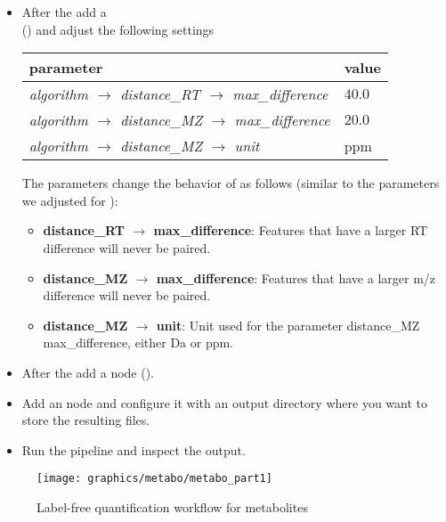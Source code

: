 \begin{itemize}
\item
After the  add a  \\
 () and adjust the following settings

\begin{center}
\begin{tabular}{l|l}
\textbf{parameter} & \textbf{value} \\ \hline
\textit{algorithm $\rightarrow$ distance\_RT $\rightarrow$ max\_difference} & $40.0$ \\
\textit{algorithm $\rightarrow$ distance\_MZ $\rightarrow$ max\_difference} & $20.0$ \\
\textit{algorithm $\rightarrow$ distance\_MZ $\rightarrow$ unit} & ppm
\end{tabular}
\end{center}

\noindent The parameters change the behavior of  as follows (similar to the parameters we adjusted for ):
\begin{itemize}
\item \textbf{distance\_RT $\rightarrow$ max\_difference}: Features that have a larger RT difference will never be paired.
\item \textbf{distance\_MZ $\rightarrow$ max\_difference}: Features that have a larger m/z difference will never be paired.
\item \textbf{distance\_MZ $\rightarrow$ unit}: Unit used for the parameter distance\_MZ max\_difference, either Da or ppm.
\end{itemize}

\item
After the  add a  node ().
\item
Add an  node and configure it with an output directory where you want to store the resulting files.
\item
Run the pipeline and inspect the output.
\end{itemize}

\begin{figure}[htbp]
  \centering
  \texttt{[image: graphics/metabo/metabo\_part1]}
  \caption{Label-free quantification workflow for metabolites}
  \label{fig:metabo_part1}
\end{figure}

